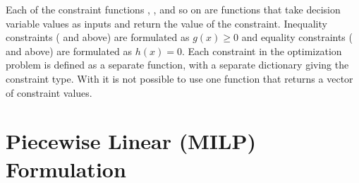 \documentclass[letterpaper,10pt,english]{sphinxmanual}
\begin{document}
\begin{sphinxVerbatim}[commandchars=\\\{\}]
  \PYG{p}{[}    
                   
                   
                   
                 \PYG{p}{]}
\end{sphinxVerbatim}

Each of the constraint functions , , and so on are functions that take decision variable values as inputs and return the value of the constraint. Inequality constraints ( and  above) are formulated as \(g(x) \geq 0\) and equality constraints ( and  above) are formulated as \(h(x) = 0\). Each constraint in the optimization problem is defined as a separate function, with a separate dictionary giving the constraint type. With  it is not possible to use one function that returns a vector of constraint values.


\section{Piecewise Linear (MILP) Formulation}
\label{\detokenize{optimizers:piecewise-linear-milp-formulation}}
\end{document}
